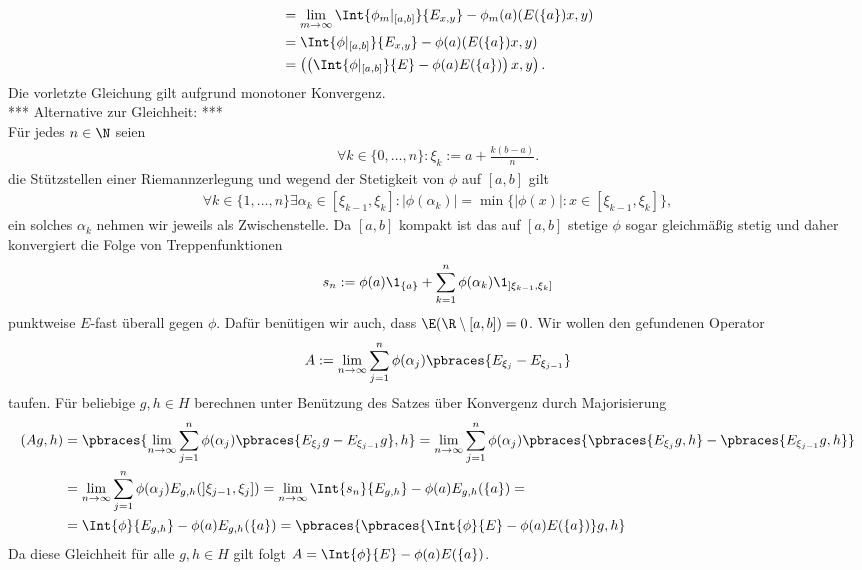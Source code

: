 \begin{solution}
\begin{align*}
  &= \lim_{m \to \infty} \Int{\phi_m|_{[a,b]}}{E_{x,y}} - \phi_m(a)(E(\{a\})x,y) \\
  &= \Int{\phi|_{[a,b]}}{E_{x,y}} - \phi(a)(E(\{a\})x,y) \\
  &= \left(\left(\Int{\phi|_{[a,b]}}{E} - \phi(a) E(\{a\})\right)x,y\right).
\end{align*}
Die vorletzte Gleichung gilt aufgrund monotoner Konvergenz. \\
*** Alternative zur Gleichheit: *** \\
Für jedes $n \in \N$ seien 
\begin{align*}
  \forall k \in \{0, \dots, n\}: \xi_k := a + \frac{k (b - a)}{n}.
\end{align*}
die Stützstellen einer Riemannzerlegung und wegend der Stetigkeit von $\phi$ auf $[a, b]$ gilt
\begin{align*}
  \forall k \in \{1, \dots, n\} \exists \alpha_k \in [\xi_{k-1}, \xi_k]: |\phi(\alpha_k)| = \min\{|\phi(x)| : x \in [\xi_{k - 1}, \xi_k]\},
\end{align*}
ein solches $\alpha_k$ nehmen wir jeweils als Zwischenstelle. Da $[a, b]$ kompakt ist das auf $[a, b]$ stetige $\phi$ sogar gleichmäßig stetig und daher konvergiert die Folge von Treppenfunktionen 
\begin{align*}
  s_n := \phi(a) \1_{\{a\}} + \sum_{k = 1}^n \phi(\alpha_k) \1_{]\xi_{k-1}, \xi_k]}
\end{align*}
punktweise $E$-fast überall gegen $\phi$. Dafür benütigen wir auch, dass $\E(\R \setminus [a, b]) = 0$. Wir wollen den gefundenen Operator
\begin{align*}
  A := \lim_{n \to \infty} \sum_{j = 1}^n \phi(\alpha_j) \pbraces{E_{\xi_j} - E_{\xi_{j - 1}}}
\end{align*} 
taufen. Für beliebige $g, h \in H$ berechnen unter Benützung des Satzes über Konvergenz durch Majorisierung
\begin{align*}
  (Ag, h) &= \pbraces{\lim_{n \to \infty} \sum_{j = 1}^n \phi(\alpha_j) \pbraces{E_{\xi_j}g - E_{\xi_{j - 1}}g}, h} = \lim_{n \to \infty} \sum_{j = 1}^n \phi(\alpha_j) \pbraces{\pbraces{E_{\xi_j}g, h} - \pbraces{E_{\xi_{j - 1}}g, h}} \\
  & = \lim_{n \to \infty} \sum_{j = 1}^n \phi(\alpha_j) E_{g, h}(]\xi_{j - 1}, \xi_j]) = \lim_{n \to \infty} \Int{s_n}{E_{g,h}} - \phi(a) E_{g, h}(\{a\}) = \\
  &= \Int{\phi}{E_{g, h}} - \phi(a) E_{g, h}(\{a\}) = \pbraces{\pbraces{\Int{\phi}{E} - \phi(a)E(\{a\})}g, h}
\end{align*}
Da diese Gleichheit für alle $g, h \in H$ gilt folgt $A = \Int{\phi}{E} - \phi(a)E(\{a\})$.
\end{solution}
